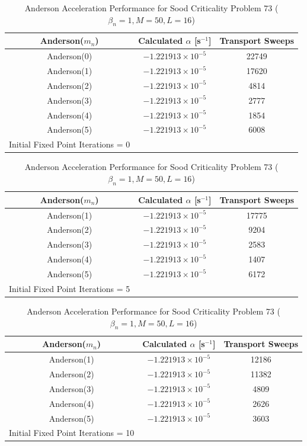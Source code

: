 \begin{table}[!htbp]
\caption{Anderson Acceleration Performance for Sood Criticality Problem 73 ($\beta_{n} = 1, M = 50, L = 16$)}
	\label{table:Sood73AA}
	\begin{subtable}[h]{1.0\textwidth}
	\centering{}
	\begin{tabular}{@{}ccc@{}}\toprule
	Anderson($m_{n}$) & Calculated $\alpha$ [s$^{-1}$] & Transport Sweeps \\
	\midrule
	Anderson(0) & $-1.221913 \times 10^{-5}$ & 22749 \\
	Anderson(1) & $-1.221913 \times 10^{-5}$ & 17620 \\
	Anderson(2) & $-1.221913 \times 10^{-5}$ & 4814  \\
	Anderson(3) & $-1.221913 \times 10^{-5}$ & 2777  \\
	Anderson(4) & $-1.221913 \times 10^{-5}$ & 1854  \\
	Anderson(5) & $-1.221913 \times 10^{-5}$ & 6008  \\
	\bottomrule
	Initial Fixed Point Iterations = 0
	\end{tabular}
	\end{subtable}%
	\vspace{0.25cm}
	\begin{subtable}[h]{1.0\textwidth}
	\centering{}
	\begin{tabular}{@{}ccc@{}}\toprule
	Anderson($m_{n}$) & Calculated $\alpha$ [s$^{-1}$] & Transport Sweeps \\
	\midrule
	Anderson(1) & $-1.221913 \times 10^{-5}$ & 17775 \\
	Anderson(2) & $-1.221913 \times 10^{-5}$ & 9204 \\
	Anderson(3) & $-1.221913 \times 10^{-5}$ & 2583 \\
	Anderson(4) & $-1.221913 \times 10^{-5}$ & 1407 \\
	Anderson(5) & $-1.221913 \times 10^{-5}$ & 6172 \\
	\bottomrule
	Initial Fixed Point Iterations = 5
	\end{tabular}
	\end{subtable}%
	\vspace{0.25cm}
	\begin{subtable}[h]{1.0\textwidth}
	\centering{}
	\begin{tabular}{@{}ccc@{}}\toprule
	Anderson($m_{n}$) & Calculated $\alpha$ [s$^{-1}$] & Transport Sweeps \\
	\midrule
	Anderson(1) & $-1.221913 \times 10^{-5}$ & 12186 \\
	Anderson(2) & $-1.221913 \times 10^{-5}$ & 11382 \\
	Anderson(3) & $-1.221913 \times 10^{-5}$ & 4809 \\
	Anderson(4) & $-1.221913 \times 10^{-5}$ & 2626 \\
	Anderson(5) & $-1.221913 \times 10^{-5}$ & 3603 \\
	\bottomrule
	Initial Fixed Point Iterations = 10
	\end{tabular}
	\end{subtable}
\end{table}

